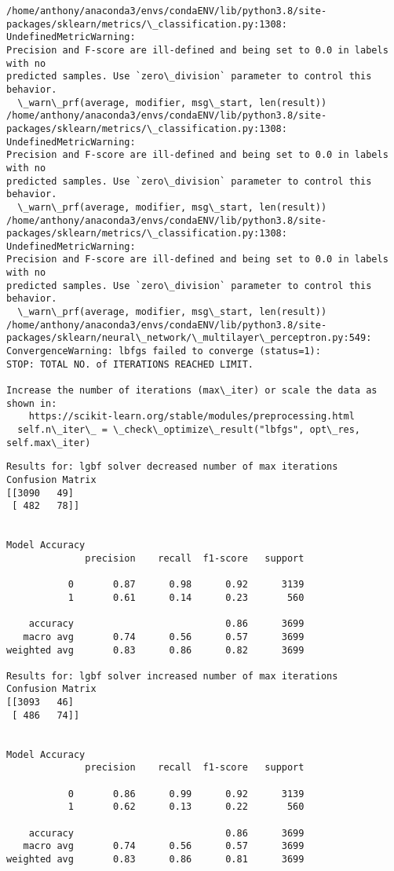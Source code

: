 \documentclass[11pt]{article}
\begin{document}
    \begin{Verbatim}[commandchars=\\\{\}]
/home/anthony/anaconda3/envs/condaENV/lib/python3.8/site-
packages/sklearn/metrics/\_classification.py:1308: UndefinedMetricWarning:
Precision and F-score are ill-defined and being set to 0.0 in labels with no
predicted samples. Use `zero\_division` parameter to control this behavior.
  \_warn\_prf(average, modifier, msg\_start, len(result))
/home/anthony/anaconda3/envs/condaENV/lib/python3.8/site-
packages/sklearn/metrics/\_classification.py:1308: UndefinedMetricWarning:
Precision and F-score are ill-defined and being set to 0.0 in labels with no
predicted samples. Use `zero\_division` parameter to control this behavior.
  \_warn\_prf(average, modifier, msg\_start, len(result))
/home/anthony/anaconda3/envs/condaENV/lib/python3.8/site-
packages/sklearn/metrics/\_classification.py:1308: UndefinedMetricWarning:
Precision and F-score are ill-defined and being set to 0.0 in labels with no
predicted samples. Use `zero\_division` parameter to control this behavior.
  \_warn\_prf(average, modifier, msg\_start, len(result))
/home/anthony/anaconda3/envs/condaENV/lib/python3.8/site-
packages/sklearn/neural\_network/\_multilayer\_perceptron.py:549:
ConvergenceWarning: lbfgs failed to converge (status=1):
STOP: TOTAL NO. of ITERATIONS REACHED LIMIT.

Increase the number of iterations (max\_iter) or scale the data as shown in:
    https://scikit-learn.org/stable/modules/preprocessing.html
  self.n\_iter\_ = \_check\_optimize\_result("lbfgs", opt\_res, self.max\_iter)
    \end{Verbatim}

    \begin{Verbatim}[commandchars=\\\{\}]
Results for: lgbf solver decreased number of max iterations
Confusion Matrix
[[3090   49]
 [ 482   78]]


Model Accuracy
              precision    recall  f1-score   support

           0       0.87      0.98      0.92      3139
           1       0.61      0.14      0.23       560

    accuracy                           0.86      3699
   macro avg       0.74      0.56      0.57      3699
weighted avg       0.83      0.86      0.82      3699

Results for: lgbf solver increased number of max iterations
Confusion Matrix
[[3093   46]
 [ 486   74]]


Model Accuracy
              precision    recall  f1-score   support

           0       0.86      0.99      0.92      3139
           1       0.62      0.13      0.22       560

    accuracy                           0.86      3699
   macro avg       0.74      0.56      0.57      3699
weighted avg       0.83      0.86      0.81      3699

    \end{Verbatim}
\end{document}
